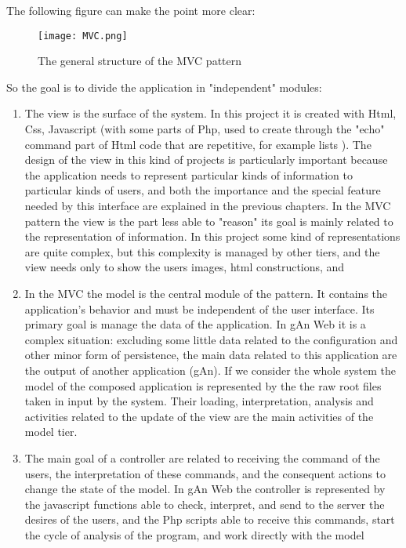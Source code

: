The following figure can make the point more clear:

\begin{figure}[H]
\centering
\texttt{[image: MVC.png]}  
\caption{The general structure of the MVC pattern}
\end{figure}    

So the goal is to divide the application in "independent" modules:

\begin{enumerate}

\item The view is the surface of the system. In this project it is created with Html, Css, Javascript (with some parts of Php, used to create through the "echo" command part of Html code that are repetitive, for example lists ). The design of the view in this kind of projects is particularly important because the application needs to represent particular kinds of information to particular kinds of users, and both the importance and the special feature needed by this interface are explained in the previous chapters. In the MVC pattern the view is the part less able to "reason" its goal is mainly related to the representation of information. In this project some kind of representations are quite complex, but this complexity is managed by other tiers, and the view needs only to show the users images, html constructions, and 

\item In the MVC the model is the central module of the pattern. It contains the application's behavior and must be independent of the user interface. Its primary goal is manage the data of the application. In gAn Web it is a complex situation: excluding some little data related to the configuration and other minor form of persistence, the main data related to this application are the output of another application (gAn). If we consider the whole system the model of the composed application is represented by the the raw root files taken in input by the system. Their loading, interpretation, analysis and activities related to the update of the view are the main activities of the model tier.   

\item The main goal of a controller are related to receiving the command of the users, the interpretation of these commands, and the consequent actions to change the state of the model. In gAn Web the controller is represented by the javascript functions able to check, interpret, and send to the server the desires of the users, and the Php scripts able to receive this commands, start the cycle of analysis of the program, and work directly with the model 


\end{enumerate}
 


